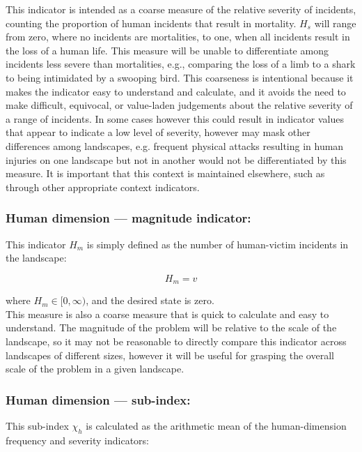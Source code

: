 \documentclass[fleqn,10pt]{olplainarticle}
\begin{document}
This indicator is intended as a coarse measure of the relative severity of incidents, counting the proportion of human incidents that result in mortality. $H_s$ will range from zero, where no incidents are mortalities, to one, when all incidents result in the loss of a human life. This measure will be unable to differentiate among incidents less severe than mortalities, e.g., comparing the loss of a limb to a shark to being intimidated by a swooping bird. This coarseness is intentional because it makes the indicator easy to understand and calculate, and it avoids the need to make difficult, equivocal, or value-laden judgements about the relative severity of a range of incidents. In some cases however this could result in indicator values that appear to indicate a low level of severity, however may mask other differences among landscapes, e.g. frequent physical attacks resulting in human injuries on one landscape but not in another would not be differentiated by this measure. It is important that this context is maintained elsewhere, such as through other appropriate context indicators.\\

\subsubsection*{Human dimension --- magnitude indicator:}
This indicator $H_m$ is simply defined as the number of human-victim incidents in the landscape:

\begin{equation*}
    H_m = v
\end{equation*}

where $H_m \in [0,\infty)$, and the desired state is zero.\\

This measure is also a coarse measure that is quick to calculate and easy to understand. The magnitude of the problem will be relative to the scale of the landscape, so it may not be reasonable to directly compare this indicator across landscapes of different sizes, however it will be useful for grasping the overall scale of the problem in a given landscape.\\

\subsubsection*{Human dimension --- sub-index:}
This sub-index $\chi_h$ is calculated as the arithmetic mean of  the human-dimension frequency and severity indicators:
\end{document}
